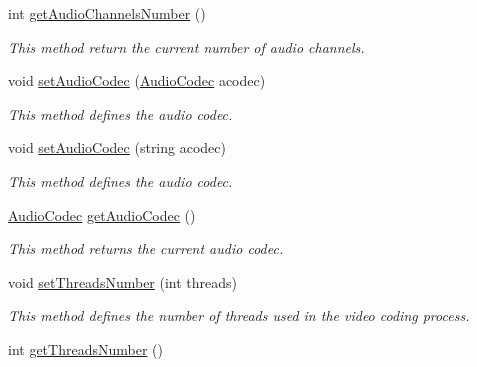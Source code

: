 \begin{DoxyCompactItemize}
int \hyperlink{classbr_1_1ufscar_1_1lince_1_1xpta_1_1streaming_1_1AVEncoder_af32b48a3bb42e7e95b5c389fd61d6ce1}{getAudioChannelsNumber} ()
\begin{DoxyCompactList}\small\item\em This method return the current number of audio channels. \item\end{DoxyCompactList}\item 
void \hyperlink{classbr_1_1ufscar_1_1lince_1_1xpta_1_1streaming_1_1AVEncoder_a9a501788c30ee13b6f79053e5f94d21f}{setAudioCodec} (\hyperlink{namespacebr_1_1ufscar_1_1lince_1_1xpta_1_1streaming_afc25fb5f7c0f63197ec25d8d9de19b01}{AudioCodec} acodec)
\begin{DoxyCompactList}\small\item\em This method defines the audio codec. \item\end{DoxyCompactList}\item 
void \hyperlink{classbr_1_1ufscar_1_1lince_1_1xpta_1_1streaming_1_1AVEncoder_aec4925cdba6f2a4c5776f196e2cc6100}{setAudioCodec} (string acodec)
\begin{DoxyCompactList}\small\item\em This method defines the audio codec. \item\end{DoxyCompactList}\item 
\hyperlink{namespacebr_1_1ufscar_1_1lince_1_1xpta_1_1streaming_afc25fb5f7c0f63197ec25d8d9de19b01}{AudioCodec} \hyperlink{classbr_1_1ufscar_1_1lince_1_1xpta_1_1streaming_1_1AVEncoder_a21a3ce2125b5df0e3d7a8a47df6e5012}{getAudioCodec} ()
\begin{DoxyCompactList}\small\item\em This method returns the current audio codec. \item\end{DoxyCompactList}\item 
void \hyperlink{classbr_1_1ufscar_1_1lince_1_1xpta_1_1streaming_1_1AVEncoder_ae4bbdcbc13bf874954d3087dda55080e}{setThreadsNumber} (int threads)
\begin{DoxyCompactList}\small\item\em This method defines the number of threads used in the video coding process. \item\end{DoxyCompactList}\item 
int \hyperlink{classbr_1_1ufscar_1_1lince_1_1xpta_1_1streaming_1_1AVEncoder_a335b684db9eabcb884a4d34772c2283c}{getThreadsNumber} ()

\end{DoxyCompactItemize}

